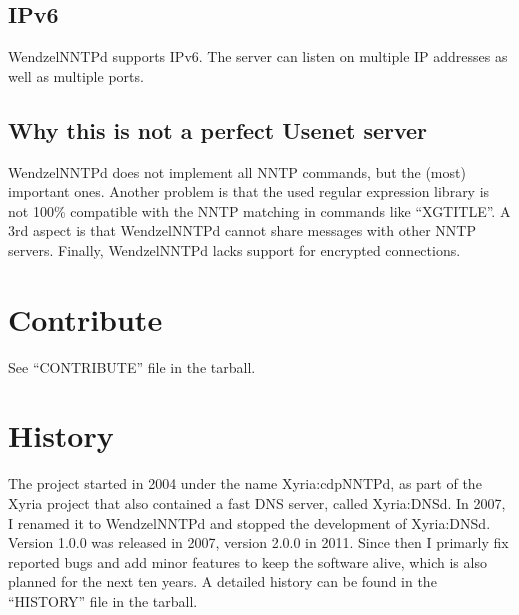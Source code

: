 \subsection{IPv6}

WendzelNNTPd supports IPv6. The server can listen on multiple IP addresses as well as multiple ports.

\subsection{Why this is not a perfect Usenet server}

WendzelNNTPd does not implement all NNTP commands, but the (most) important ones. Another problem is that the used regular expression library is not 100\% compatible with the NNTP matching in commands like ``XGTITLE''. A 3rd aspect is that WendzelNNTPd cannot share messages with other NNTP servers. Finally, WendzelNNTPd lacks support for encrypted connections.

\section{Contribute}

See ``CONTRIBUTE'' file in the tarball.

\section{History}

The project started in 2004 under the name Xyria:cdpNNTPd, as part of the Xyria project that also contained a fast DNS server, called Xyria:DNSd. In 2007, I renamed it to WendzelNNTPd and stopped the development of Xyria:DNSd. Version 1.0.0 was released in 2007, version 2.0.0 in 2011. Since then I primarly fix reported bugs and add minor features to keep the software alive, which is also planned for the next ten years. A detailed history can be found in the ``HISTORY'' file in the tarball.





